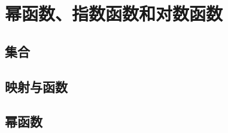 \chapter{幂函数、指数函数和对数函数}

\section{集合}





\newpage
\section{映射与函数}





\newpage
\section{幂函数}






